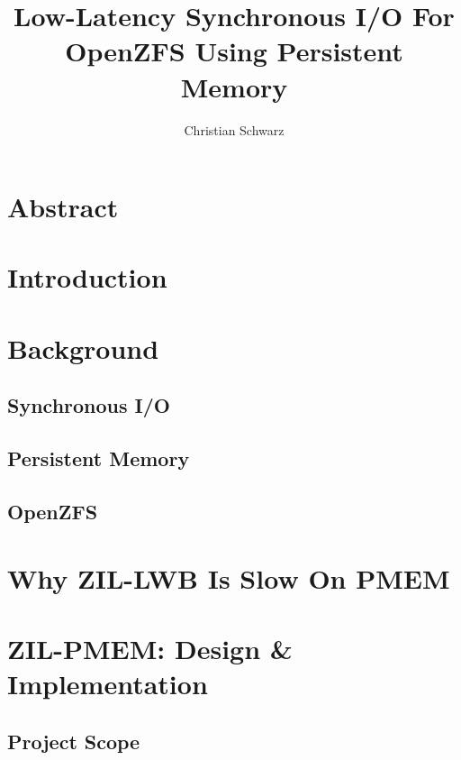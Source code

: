 \documentclass[12pt,a4paper,twoside,draft]{book}
\begin{document}
\frontmatter
{}

\title{Low-Latency Synchronous I/O For OpenZFS Using Persistent Memory}
\author{Christian Schwarz}
\maketitle



\chapter{Abstract}
\blindtext

\mainmatter
\cleardoublepage
{}
{}
\tableofcontents

\chapter{Introduction}

\chapter{Background}
\section{Synchronous I/O}
\section{Persistent Memory}
\section{OpenZFS}

\chapter{Why ZIL-LWB Is Slow On PMEM}

\chapter{ZIL-PMEM: Design \& Implementation}

\section{Project Scope}
\end{document}
